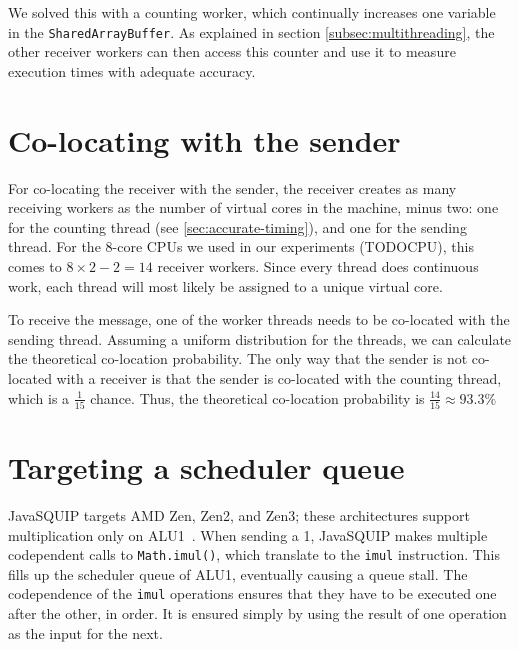 \documentclass[11pt,
  titlepage=false,
]{scrreprt}
\begin{document}
We solved this with a counting worker, which continually increases one variable in the \texttt{SharedArrayBuffer}.
As explained in section \ref{subsec:multithreading}, the other receiver workers can then access this counter and use it to measure execution times with adequate accuracy.

\section{Co-locating with the sender}
\label{sec:co-location}
For co-locating the receiver with the sender, the receiver creates as many receiving workers as the number of virtual cores in the machine, minus two:
one for the counting thread (see \ref{sec:accurate-timing}), and one for the sending thread.
For the 8-core CPUs we used in our experiments (TODOCPU), this comes to $8 \times 2 - 2 = 14$ receiver workers.
Since every thread does continuous work, each thread will most likely be assigned to a unique virtual core.

To receive the message, one of the worker threads needs to be co-located with the sending thread.
Assuming a uniform distribution for the threads, we can calculate the theoretical co-location probability.
The only way that the sender is not co-located with a receiver is that the sender is co-located with the counting thread,
which is a $\frac{1}{15}$ chance.
Thus, the theoretical co-location probability is $\frac{14}{15} \approx 93.3\%$

\section{Targeting a scheduler queue}
JavaSQUIP targets AMD Zen, Zen2, and Zen3;
these architectures support multiplication only on ALU1~\cite{AMD2020OptimizationEPYC7003}.
When sending a 1, JavaSQUIP makes multiple codependent calls to \texttt{Math.imul()}, which translate to the \texttt{imul} instruction.
This fills up the scheduler queue of ALU1, eventually causing a queue stall.
The codependence of the \texttt{imul} operations ensures that they have to be executed one after the other, in order.
It is ensured simply by using the result of one operation as the input for the next.
\end{document}
